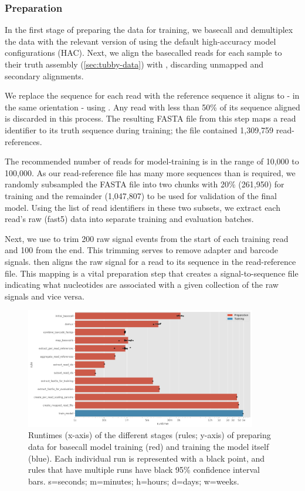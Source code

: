 \subsubsection{Preparation}

In the first stage of preparing the data for training, we basecall and demultiplex the data with the relevant version of \guppy{} using the default high-accuracy model configurations (HAC). Next, we align the basecalled reads for each sample to their truth assembly (\autoref{sec:tubby-data}) with  \cite{li2018}, discarding unmapped and secondary alignments.

We replace the sequence for each read with the reference sequence it aligns to - in the same orientation - using \taiyaki{}. Any read with less than 50\% of its sequence aligned is discarded in this process. The resulting FASTA file from this step maps a read identifier to its truth sequence during training; the file contained 1,309,759 read-references.

The recommended number of reads for \taiyaki{} model-training is in the range of 10,000 to 100,000. As our read-reference file has many more sequences than is required, we randomly subsampled the FASTA file into two chunks with 20\% (261,950) for training and the remainder (1,047,807) to be used for validation of the final model. Using the list of read identifiers in these two subsets, we extract each read's raw (fast5) data into separate training and evaluation batches. 

Next, we use \taiyaki{} to trim 200 raw signal events from the start of each training read and 100 from the end. This trimming serves to remove adapter and barcode signals. \taiyaki{} then aligns the raw signal for a read to its sequence in the read-reference file. This mapping is a vital preparation step that creates a signal-to-sequence file indicating what nucleotides are associated with a given collection of the raw signals and vice versa.

\begin{figure}
\includegraphics[width=0.9\textwidth]{Chapter4/Figs/prep_runtime.png}
\centering
\caption{Runtimes (x-axis) of the different stages (rules; y-axis) of preparing data for basecall model training (red) and training the model itself (blue). Each individual run is represented with a black point, and rules that have multiple runs have black 95\% confidence interval bars. s=seconds; m=minutes; h=hours; d=days; w=weeks.}
\label{fig:prep_runtime}
\end{figure}

